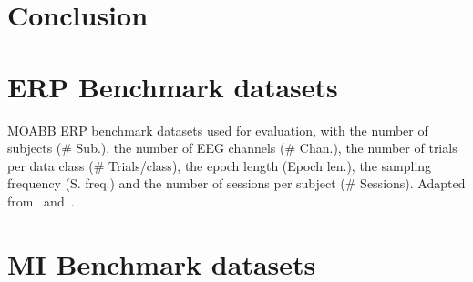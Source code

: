 \documentclass[twocolumn]{article}
\begin{document}
\section{Conclusion}

\printbibliography

\clearpage
\appendix

\onecolumn
\section{ERP Benchmark datasets}
\begin{table*}[htp]
  
  \caption{MOABB ERP benchmark datasets used for evaluation, with the number of
  subjects (\# Sub.), the number of EEG channels (\# Chan.), the number of trials
per data class (\# Trials/class), the epoch length (Epoch len.), the sampling
frequency (S. freq.) and the number of sessions per subject (\# Sessions).
Adapted from~\cite{Aristimunha2023} and~\cite{Chevallier2024}.}
  \label{tab:moabb-erp}
\end{table*}
\section{MI Benchmark datasets}
\end{document}
